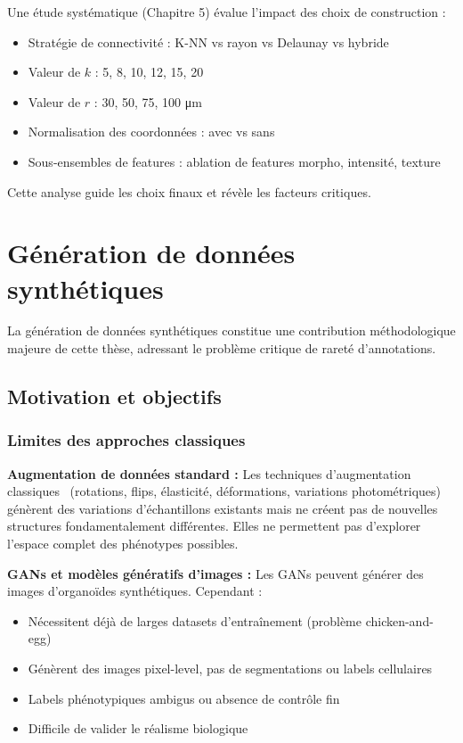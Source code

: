 Une étude systématique (Chapitre 5) évalue l'impact des choix de construction :
\begin{itemize}
    \item Stratégie de connectivité : K-NN vs rayon vs Delaunay vs hybride
    \item Valeur de $k$ : {5, 8, 10, 12, 15, 20}
    \item Valeur de $r$ : {30, 50, 75, 100} μm
    \item Normalisation des coordonnées : avec vs sans
    \item Sous-ensembles de features : ablation de features morpho, intensité, texture
\end{itemize}

Cette analyse guide les choix finaux et révèle les facteurs critiques.

\section{Génération de données synthétiques}

La génération de données synthétiques constitue une contribution méthodologique majeure de cette thèse, adressant le problème critique de rareté d'annotations.

\subsection{Motivation et objectifs}

\subsubsection{Limites des approches classiques}

\textbf{Augmentation de données standard :}
Les techniques d'augmentation classiques~\cite{Shorten2019} (rotations, flips, élasticité, déformations, variations photométriques) génèrent des variations d'échantillons existants mais ne créent pas de nouvelles structures fondamentalement différentes. Elles ne permettent pas d'explorer l'espace complet des phénotypes possibles.

\textbf{GANs et modèles génératifs d'images :}
Les GANs peuvent générer des images d'organoïdes synthétiques. Cependant :
\begin{itemize}
    \item Nécessitent déjà de larges datasets d'entraînement (problème chicken-and-egg)
    \item Génèrent des images pixel-level, pas de segmentations ou labels cellulaires
    \item Labels phénotypiques ambigus ou absence de contrôle fin
    \item Difficile de valider le réalisme biologique
\end{itemize}

